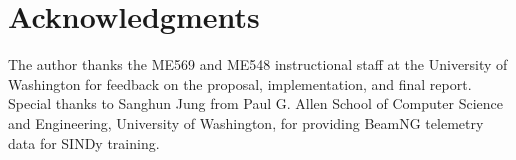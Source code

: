 \documentclass[letterpaper, 10 pt, conference]{ieeeconf}  %
\begin{document}
\section*{Acknowledgments}

The author thanks the ME569 and ME548 instructional staff at the University of Washington for feedback on the proposal, implementation, and final report. Special thanks to Sanghun Jung from Paul G. Allen School of Computer Science and Engineering, University of Washington, for providing BeamNG telemetry data for SINDy training.










\end{document}
